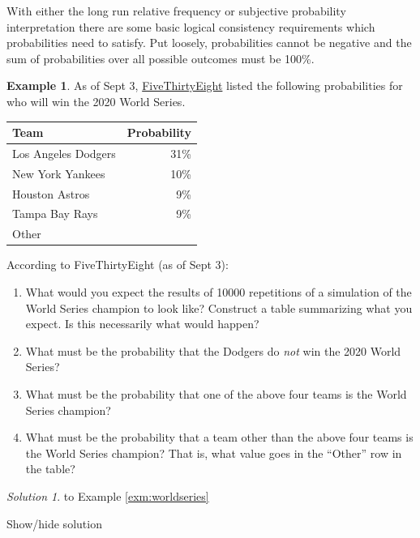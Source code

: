 \documentclass[
]{book}
\providecommand{\tightlist}{%
  \setlength{\itemsep}{0pt}\setlength{\parskip}{0pt}}
\theoremstyle{definition}
\theoremstyle{definition}
\newtheorem{example}{Example}[chapter]
\theoremstyle{definition}
\theoremstyle{remark}
\newtheorem*{solution}{Solution}
\begin{document}
With either the long run relative frequency or subjective probability interpretation there are some basic logical consistency requirements which probabilities need to satisfy. Put loosely, probabilities cannot be negative and the sum of probabilities over all possible outcomes must be 100\%.

\begin{example}
\protect\hypertarget{exm:worldseries}{}{\label{exm:worldseries} }
As of Sept 3, \href{https://projects.fivethirtyeight.com/2019mlb-predictions/}{FiveThirtyEight} listed the following probabilities for who will
win the 2020 World Series.
\end{example}

\begin{longtable}[]{@{}lr@{}}
\toprule
Team & Probability\tabularnewline
\midrule
\endhead
Los Angeles Dodgers & 31\%\tabularnewline
New York Yankees & 10\%\tabularnewline
Houston Astros & 9\%\tabularnewline
Tampa Bay Rays & 9\%\tabularnewline
Other &\tabularnewline
\bottomrule
\end{longtable}

According to FiveThirtyEight (as of Sept 3):

\begin{enumerate}
\def\labelenumi{\arabic{enumi}.}
\tightlist
\item
  What would you expect the results of 10000 repetitions of a simulation of the World Series champion to look like? Construct a table summarizing what you expect. Is this necessarily what would happen?
\item
  What must be the probability that the Dodgers do \emph{not} win the 2020 World Series?
\item
  What must be the probability that one of the above four teams is the World Series champion?
\item
  What must be the probability that a team other than the above four teams is the World Series champion? That is, what value goes in the ``Other'' row in the table?
\end{enumerate}

\begin{solution}
{}
to Example \ref{exm:worldseries}
\end{solution}

Show/hide solution
\end{document}
